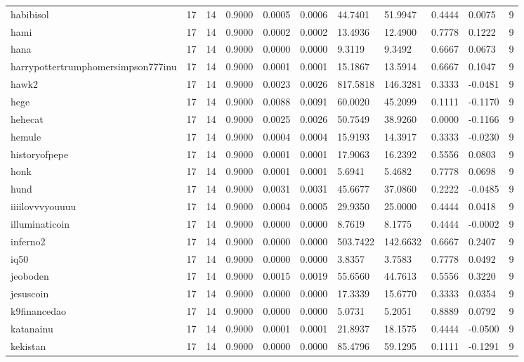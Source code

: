 \begin{table}[htbp]
\begin{tabular}{lllllllllll}
habibisol & 17 & 14 & 0.9000 & 0.0005 & 0.0006 & 44.7401 & 51.9947 & 0.4444 & 0.0075 & 9 \\
hami & 17 & 14 & 0.9000 & 0.0002 & 0.0002 & 13.4936 & 12.4900 & 0.7778 & 0.1222 & 9 \\
hana & 17 & 14 & 0.9000 & 0.0000 & 0.0000 & 9.3119 & 9.3492 & 0.6667 & 0.0673 & 9 \\
harrypottertrumphomersimpson777inu & 17 & 14 & 0.9000 & 0.0001 & 0.0001 & 15.1867 & 13.5914 & 0.6667 & 0.1047 & 9 \\
hawk2 & 17 & 14 & 0.9000 & 0.0023 & 0.0026 & 817.5818 & 146.3281 & 0.3333 & -0.0481 & 9 \\
hege & 17 & 14 & 0.9000 & 0.0088 & 0.0091 & 60.0020 & 45.2099 & 0.1111 & -0.1170 & 9 \\
hehecat & 17 & 14 & 0.9000 & 0.0025 & 0.0026 & 50.7549 & 38.9260 & 0.0000 & -0.1166 & 9 \\
hemule & 17 & 14 & 0.9000 & 0.0004 & 0.0004 & 15.9193 & 14.3917 & 0.3333 & -0.0230 & 9 \\
historyofpepe & 17 & 14 & 0.9000 & 0.0001 & 0.0001 & 17.9063 & 16.2392 & 0.5556 & 0.0803 & 9 \\
honk & 17 & 14 & 0.9000 & 0.0001 & 0.0001 & 5.6941 & 5.4682 & 0.7778 & 0.0698 & 9 \\
hund & 17 & 14 & 0.9000 & 0.0031 & 0.0031 & 45.6677 & 37.0860 & 0.2222 & -0.0485 & 9 \\
iiiilovvvyouuuu & 17 & 14 & 0.9000 & 0.0004 & 0.0005 & 29.9350 & 25.0000 & 0.4444 & 0.0418 & 9 \\
illuminaticoin & 17 & 14 & 0.9000 & 0.0000 & 0.0000 & 8.7619 & 8.1775 & 0.4444 & -0.0002 & 9 \\
inferno2 & 17 & 14 & 0.9000 & 0.0000 & 0.0000 & 503.7422 & 142.6632 & 0.6667 & 0.2407 & 9 \\
iq50 & 17 & 14 & 0.9000 & 0.0000 & 0.0000 & 3.8357 & 3.7583 & 0.7778 & 0.0492 & 9 \\
jeoboden & 17 & 14 & 0.9000 & 0.0015 & 0.0019 & 55.6560 & 44.7613 & 0.5556 & 0.3220 & 9 \\
jesuscoin & 17 & 14 & 0.9000 & 0.0000 & 0.0000 & 17.3339 & 15.6770 & 0.3333 & 0.0354 & 9 \\
k9financedao & 17 & 14 & 0.9000 & 0.0000 & 0.0000 & 5.0731 & 5.2051 & 0.8889 & 0.0792 & 9 \\
katanainu & 17 & 14 & 0.9000 & 0.0001 & 0.0001 & 21.8937 & 18.1575 & 0.4444 & -0.0500 & 9 \\
kekistan & 17 & 14 & 0.9000 & 0.0000 & 0.0000 & 85.4796 & 59.1295 & 0.1111 & -0.1291 & 9 \\

\end{tabular}
\end{table}
